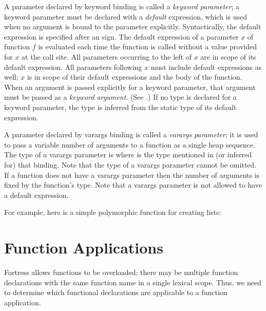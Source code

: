 A parameter declared by keyword binding is called
a \emph{keyword parameter};
a keyword parameter must be declared with
a \emph{default} expression,
which is used when no argument is bound to the parameter explicitly.
Syntactically, the default expression is specified
after an \EXP{=} sign.
The default expression of a parameter $x$ of function $f$
is evaluated each time the function is called
without a value provided for $x$ at the call site.
All parameters occurring to the left of $x$
are in scope of its default expression.
All parameters following $x$ must include default expressions as well;
$x$ is in scope of their default expressions and the body of the function.
When an argument is passed explicitly for a keyword parameter,
that argument must be passed as a \emph{keyword argument}.
(See .)
If no type is declared for a keyword parameter,
the type is inferred from the static type of its default expression.

A parameter declared by varargs binding is called
a \emph{varargs parameter};
it is used to pass a variable number of arguments to a function
as a single heap sequence.
The type of a varargs parameter
    is  where  is
    the type mentioned in (or inferred for) that binding.
Note that the type of a varargs parameter cannot be omitted.
If a function does not have a varargs parameter
then the number of arguments is fixed by the function's type.
Note that a varargs parameter is not allowed to have a default expression.

For example, here is a simple
polymorphic function for creating lists:


\section{Function Applications}


Fortress allows functions to be overloaded; there may be multiple function
declarations with the same function name in a single lexical scope.
Thus, we need to determine which functional declarations are applicable to
a function application.

